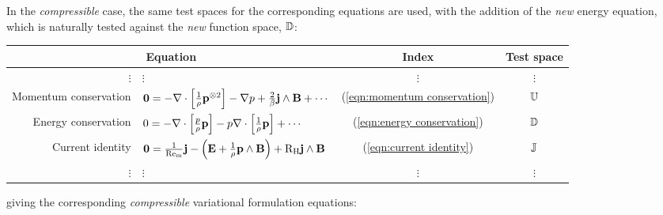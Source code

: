     In the \emph{compressible} case, the same test spaces for the corresponding equations are used, with the addition of the \emph{new} energy equation, which is naturally tested against the \emph{new} function space, $\mathbb{D}$:
    \begin{center}\begin{tabular}{ r l c | c }
        \multicolumn{2}{c}{Equation}  &  Index  &  Test space  \\
        \hline\hline
        $\vdots$  &  $\vdots$  &  $\vdots$  &  $\vdots$  \\
        Momentum conservation  &  $\mathbf{0} 
         =  - \nabla\cdot\left[\frac{1}{\rho}\mathbf{p}^{\otimes 2}\right] - \nabla p + \frac{2}{\beta}\mathbf{j}\wedge\mathbf{B} + \cdots$  &  (\ref{eqn:momentum conservation})  &  $\mathbb{U}$  \\
        Energy conservation  &  $0  =  - \nabla\cdot\left[\frac{p}{\rho}\mathbf{p}\right] - p\nabla\cdot\left[\frac{1}{\rho}\mathbf{p}\right] + \cdots$  &  (\ref{eqn:energy conservation})  &  $\mathbb{D}$  \\
        \hline
        Current identity  &  $\mathbf{0}  =  \frac{1}{\mathrm{Re}_{\mathrm{m}}}\mathbf{j} - \left(\mathbf{E} + \frac{1}{\rho}\mathbf{p}\wedge\mathbf{B}\right) + \mathrm{R}_{\mathrm{H}}\mathbf{j}\wedge\mathbf{B}$  &  (\ref{eqn:current identity})  &  $\mathbb{J}$  \\
        \hline
        $\vdots$  &  $\vdots$  &  $\vdots$  &  $\vdots$  \\
    \end{tabular}\end{center}
    giving the corresponding \emph{compressible} variational formulation equations:
